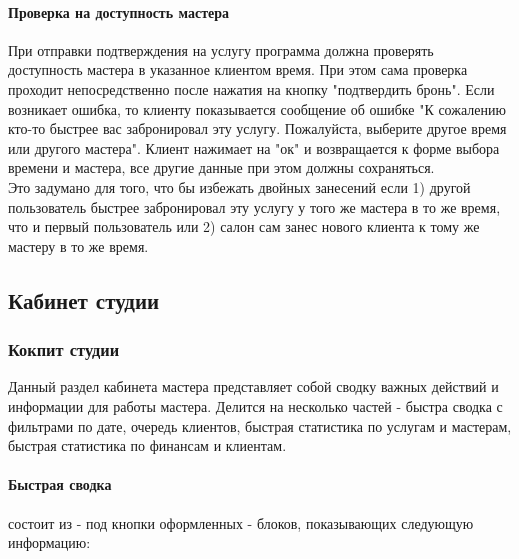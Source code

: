 \documentclass[DIV=calc, paper=a4, fontsize=11pt]{scrartcl} %
\begin{document}
\paragraph{Проверка на доступность мастера}
При отправки подтверждения на услугу программа должна проверять доступность мастера в указанное клиентом время. При этом сама проверка проходит непосредственно после нажатия на кнопку "подтвердить бронь". Если возникает ошибка, то клиенту показывается сообщение об ошибке "К сожалению кто-то быстрее вас забронировал эту услугу. Пожалуйста, выберите другое время или другого мастера". Клиент нажимает на "ок" и возвращается к форме выбора времени и мастера, все другие данные при этом должны сохраняться.
\\[0.5cm]
Это задумано для того, что бы избежать двойных занесений если 1) другой пользователь быстрее забронировал эту услугу у того же мастера в то же время, что и первый пользователь или 2) салон сам занес нового клиента к тому же мастеру в то же время.


\subsection{Кабинет студии}

\subsubsection{Кокпит студии}
Данный раздел кабинета мастера представляет собой сводку важных действий и информации для работы мастера. Делится на несколько частей - быстра сводка с фильтрами по дате, очередь клиентов, быстрая статистика по услугам и мастерам, быстрая статистика по финансам и клиентам.

\paragraph{Быстрая сводка} 
состоит из - под кнопки оформленных - блоков, показывающих следующую информацию:
\end{document}
